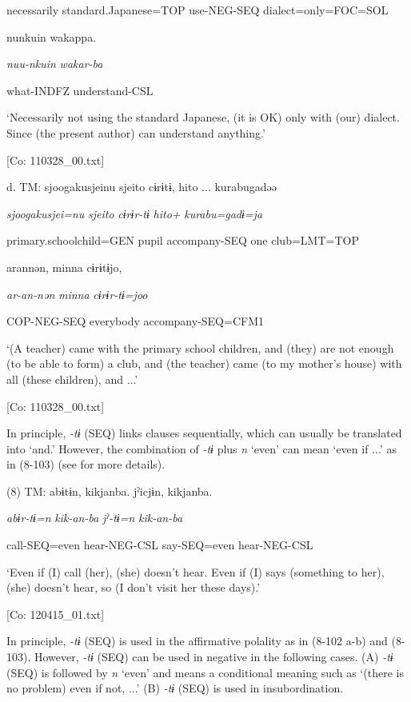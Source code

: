       necessarily  standard.Japanese=TOP  use-NEG-SEQ  dialect=only=FOC=SOL

      nunkuin  wakappa.

      \textit{nuu-nkuin}  \textit{wakar-ba}

      what-INDFZ  understand-CSL

      ‘Necessarily not using the standard Japanese, (it is OK) only with (our) dialect. Since (the present author) can understand anything.’

      [Co: 110328\_00.txt]

  d.  TM:  {\textbar}sjoogakusjei{\textbar}nu  {\textbar}sjeito{\textbar}  cɨrɨtɨ,  {\textbar}hito ...  kurabu{\textbar}gadəə

      \textit{sjoogakusjei=nu}  \textit{sjeito}  \textit{cɨrɨr-tɨ}  \textit{hito+}  \textit{kurabu=gadɨ=ja}

      primary.schoolchild=GEN  pupil  accompany-SEQ  one  club=LMT=TOP

      arannən,  minna  cɨrɨtɨjo,

      \textit{ar-an-nən}  \textit{minna}  \textit{cɨrɨr-tɨ=joo}

      COP-NEG-SEQ  everybody  accompany-SEQ=CFM1

      ‘(A teacher) came with the primary school children, and (they) are not enough (to be able to form) a club, and (the teacher) came (to my mother’s house) with all (these children), and ...’

      [Co: 110328\_00.txt]

In principle, \textit{{}-tɨ} (SEQ) links clauses sequentially, which can usually be translated into ‘and.’ However, the combination of \textit{{}-tɨ} plus \textit{n} ‘even’ can mean ‘even if ...’ as in (8-103) (see  for more details).

(8)  TM:  abɨtɨn,  kikjanba.  jˀicjɨn,  kikjanba.

    \textit{abɨr-tɨ=n}  \textit{kik-an-ba}  \textit{jˀ-tɨ=n}  \textit{kik-an-ba}

    call-SEQ=even  hear-NEG-CSL  say-SEQ=even  hear-NEG-CSL

    ‘Even if (I) call (her), (she) doesn’t hear. Even if (I) says (something to her), (she) doesn’t hear, so (I don’t visit her these days).’

    [Co: 120415\_01.txt]

In principle, \textit{{}-tɨ} (SEQ) is used in the affirmative polality as in (8-102 a-b) and (8-103). However, \textit{{}-tɨ} (SEQ) can be used in negative in the following cases. (A) \textit{{}-tɨ} (SEQ) is followed by \textit{n} ‘even’ and means a conditional meaning such as ‘(there is no problem) even if not, ...’ (B) \textit{{}-tɨ} (SEQ) is used in insubordination.

